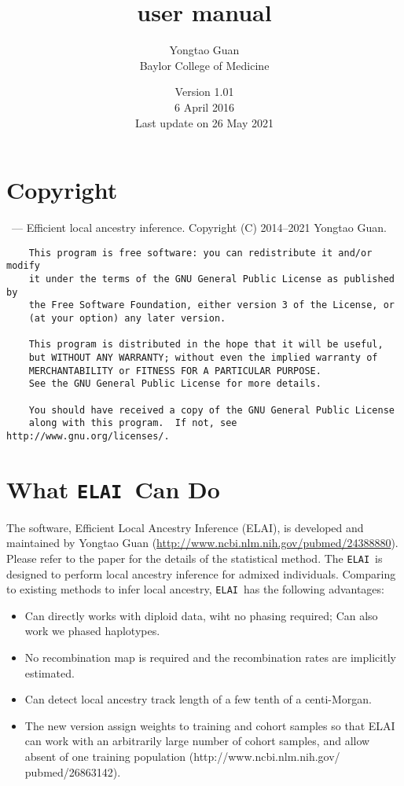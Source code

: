 \documentclass[11pt,Palatino]{article}
\title{ \elai user manual}
\author{Yongtao Guan \\ Baylor College of Medicine}
\date{Version 1.01 \\ 6 April 2016 \\Last update on 26 May 2021}
\def\elai{{\tt{ELAI}}~}
\begin{document}
\maketitle
\tableofcontents
\clearpage

\section{Copyright}

\indent \elai --- Efficient local ancestry inference.
    Copyright (C) 2014--2021 Yongtao Guan. 
\begin{verbatim}
    This program is free software: you can redistribute it and/or modify
    it under the terms of the GNU General Public License as published by
    the Free Software Foundation, either version 3 of the License, or
    (at your option) any later version.

    This program is distributed in the hope that it will be useful,
    but WITHOUT ANY WARRANTY; without even the implied warranty of
    MERCHANTABILITY or FITNESS FOR A PARTICULAR PURPOSE.  
    See the GNU General Public License for more details.

    You should have received a copy of the GNU General Public License
    along with this program.  If not, see http://www.gnu.org/licenses/.
\end{verbatim}


\section{What \elai Can Do}
The software, Efficient Local Ancestry Inference (ELAI), is developed and maintained by Yongtao Guan (\url{http://www.ncbi.nlm.nih.gov/pubmed/24388880}).  Please refer to the paper for the details of the statistical method. The \elai is designed to perform local ancestry inference for admixed individuals. Comparing to existing methods to infer local ancestry, \elai has the following advantages: 
\begin{itemize}
\itemsep-0.05in 
 \item Can directly works with diploid data, wiht no phasing required; Can also work we phased haplotypes. 
 \item No recombination map is required and the recombination rates are implicitly estimated. 
 \item Can detect local ancestry track length of a few tenth of a centi-Morgan.
 \item The new version assign weights to training and cohort samples so that ELAI can work with an arbitrarily large number of cohort samples, and allow absent of one training population (http://www.ncbi.nlm.nih.gov/ pubmed/26863142). 

\end{itemize}
\end{document}
